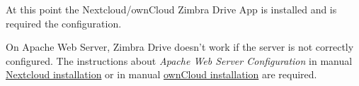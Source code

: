     At this point the Nextcloud/ownCloud Zimbra Drive App is installed and is required the configuration.
\begin{comment}
WARNING:
\end{comment}
\begin{warning}
On Apache Web Server, Zimbra Drive doesn't work if the server is not correctly configured.
The instructions about \textit{Apache Web Server Configuration} in manual
\href{https://docs.nextcloud.com/server/11/admin_manual/installation/source_installation.html#apache-web-server-configuration}{Nextcloud installation}
or in manual
\href{https://doc.owncloud.org/server/10.0/admin_manual/installation/source_installation.html#apache-web-server-configuration}{ownCloud installation}
are required.
\end{warning}